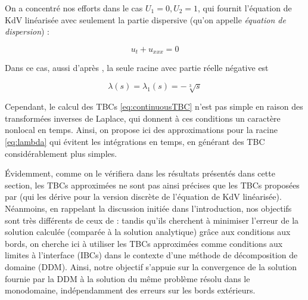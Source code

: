 \indent On a concentré nos efforts dans le cas $U_1 = 0, U_2 = 1$, qui fournit l'équation de KdV linéarisée avec seulement la partie dispersive (qu'on appelle \emph{équation de dispersion}) :

\begin{equation}
	\label{eq:DKdV}
	u_t + u_{xxx} = 0
\end{equation}

\indent Dans ce cas, aussi d'après \cite{zheng2008}, la seule racine avec partie réelle négative est

\begin{equation}
	\label{eq:lambda}
			\lambda(s) = \lambda_1(s) =  -\sqrt[3]{s} 
\end{equation}

\indent Cependant, le calcul des TBCs \eqref{eq:continuousTBC} n'est pas simple en raison des transformées inverses de Laplace, qui donnent à ces conditions un caractère nonlocal en temps. Ainsi, on propose ici des approximations pour la racine \eqref{eq:lambda} qui évitent les intégrations en temps, en générant des TBC considérablement plus simples.


\indent Évidemment, comme on le vérifiera dans les résultats présentés dans cette section, les TBCs approximées ne sont pas ainsi précises que les TBCs proposées par \cite{besse2015} (qui les dérive pour la version discrète de l'équation de KdV linéarisée). Néanmoins, en rappelant la discussion initiée dans l'introduction, nos objectifs sont très différents de ceux de \cite{besse2015} : tandis qu'ils cherchent à minimiser l'erreur de la solution calculée (comparée à la solution analytique) grâce aux conditions aux bords, on cherche ici à utiliser les TBCs approximées comme conditions aux limites à l'interface (IBCs) dans le contexte d'une méthode de décomposition de domaine (DDM). Ainsi, notre objectif s'appuie sur la convergence de la solution fournie par la DDM à la solution du même problème résolu dans le monodomaine,  indépendamment des erreurs sur les bords extérieurs. 

